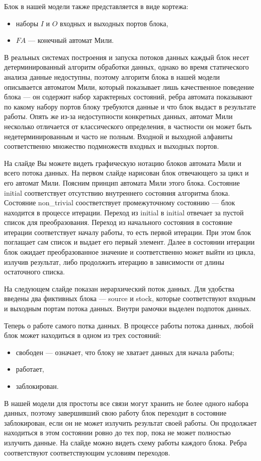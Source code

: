 \documentclass[10pt,a4paper,onecolumn]{report}
\begin{document}
  Блок в нашей модели также представляется в виде кортежа:
  \begin{itemize}
    \item наборы $I$ и $O$ входных и выходных портов блока,
    \item $FA$ --- конечный автомат Мили.
  \end{itemize}
  
  В реальных системах построения и запуска потоков данных каждый блок несет детерминированный алгоритм обработки данных,
  однако во время статического анализа данные недоступны, поэтому алгоритм блока в нашей модели описывается автоматом Мили, 
  который показывает лишь качественное поведение блока --- он содержит набор характерных состояний, ребра автомата показывают
  по какому набору портов блоку требуются данные и что блок выдаст в результате работы.
  Опять же из-за недоступности конкретных данных, автомат Мили несколько отличается от классического определения, в частности он может быть недетерминированным и
  часто не полным. Входной и выходной алфавиты соответственно множество подмножеств входных и выходных портов.
  
  На слайде Вы можете видеть графическую нотацию блоков автомата Мили и всего потока данных.
  На первом слайде нарисован блок отвечающего за цикл и его автомат Мили.
  Поясним принцип автомата Мили этого блока.
  Состояние initial соответствует отсутствию внутреннего состояния алгоритма блока.
  Состояние non\_trivial соостветствует промежуточному состоянию --- блок находится в процессе итерации.
  Переход из initial в initial отвечает за пустой список для преобразования.
  Переход из начального состояния в состояние итерации соответствует началу работы, то есть первой итерации.
  При этом блок поглащает сам список и выдает его первый элемент.
  Далее в состоянии итерации блок ожидает преобразованное значение и соответственно может выйти из цикла, излучив результат,
  либо продолжить итерацию в зависимости от длины остаточного списка.
  
  На следующем слайде показан иерархический поток данных. Для удобства введены два фиктивных блока --- source и stock, которые соответствуют
  входным и выходным портам потока данных. Внутри рамочки выделен подпоток данных.
  
  Теперь о работе самого потка данных. В процессе работы потока данных, любой блок может находиться в одном из трех состояний:
  \begin{itemize}
    \item свободен --- означает, что блоку не хватает данных для начала работы;
    \item работает,
    \item заблокирован.
  \end{itemize}
  В нашей модели для простоты все связи могут хранить не более одного набора данных, поэтому завершивший свою работу блок переходит в состояние заблокирован,
  если он не может излучить результат своей работы. Он продолжает находиться в этом состоянии ровно до тех пор, пока не может полностью излучить данные.
  На слайде можно видеть схему работы каждого блока. Ребра соответствуют соответствующим условиям переходов.
  
\end{document}
